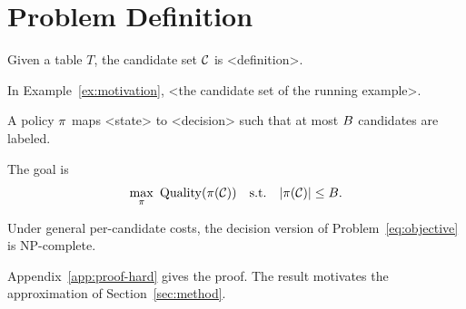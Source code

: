 \section{Problem Definition}
\label{sec:problem}

\begin{definition}
\label{def:candidate}
Given a table $T$, the candidate set $\mathcal{C}$ is <definition>.
\end{definition}

\begin{example}
\label{ex:candidate}
In Example~\ref{ex:motivation}, <the candidate set of the running example>.
\end{example}

\begin{definition}
\label{def:policy}
A policy $\pi$ maps <state> to <decision> such that at most $B$ candidates are labeled.
\end{definition}

The goal is
\begin{equation}
\label{eq:objective}
\max_{\pi}\ \mathrm{Quality}(\pi(\mathcal{C})) \quad \text{s.t.} \quad |\pi(\mathcal{C})| \le B .
\end{equation}

\begin{theorem}[Hardness]
\label{thm:hard}
Under general per-candidate costs, the decision version of Problem~\eqref{eq:objective} is NP-complete.
\end{theorem}
Appendix~\ref{app:proof-hard} gives the proof. The result motivates the approximation of Section~\ref{sec:method}.
